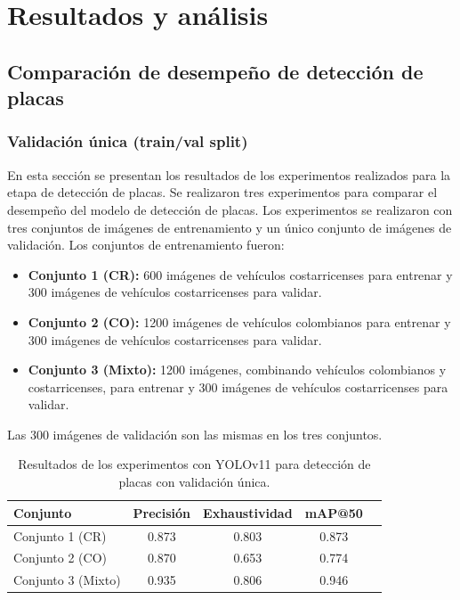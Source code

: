 \chapter{Resultados y análisis}
\label{ch:resultado}

\section{Comparación de desempeño de detección de placas}

\subsection{Validación única (train/val split)}

En esta sección se presentan los resultados de los experimentos realizados 
para la etapa de detección de placas. Se realizaron tres experimentos 
para comparar el desempeño del modelo de detección de placas. Los experimentos se
realizaron con tres conjuntos de imágenes de entrenamiento y
un único conjunto de imágenes de validación. Los conjuntos de
entrenamiento fueron:

\begin{itemize}
	\item \textbf{Conjunto 1 (CR):} 600 imágenes de vehículos costarricenses para entrenar
	y 300 imágenes de vehículos costarricenses para validar.
\item \textbf{Conjunto 2 (CO):} 1200 imágenes de vehículos colombianos para entrenar
	y 300 imágenes de vehículos costarricenses para validar.
\item \textbf{Conjunto 3 (Mixto):} 1200 imágenes, combinando vehículos colombianos y costarricenses, para entrenar
	y 300 imágenes de vehículos costarricenses para validar.
\end{itemize}
Las  300 imágenes de validación son las mismas en los tres conjuntos.

\begin{table}[ht]
	\centering
	\begin{tabular}{lcccc}
		\toprule
		\textbf{Conjunto} & \textbf{Precisión} & \textbf{Exhaustividad}  & \textbf{mAP@50} \\
		\midrule
		Conjunto 1 (CR)    & 0.873 & 0.803 & 0.873 \\
		Conjunto 2 (CO)    & 0.870 & 0.653 & 0.774 \\
		Conjunto 3 (Mixto) & 0.935 & 0.806 & 0.946 \\
		\bottomrule
	\end{tabular}
	\caption{Resultados de los experimentos con YOLOv11 para detección de placas con validación única.}
	\label{tab:yolo-metrics-unica}
\end{table}

